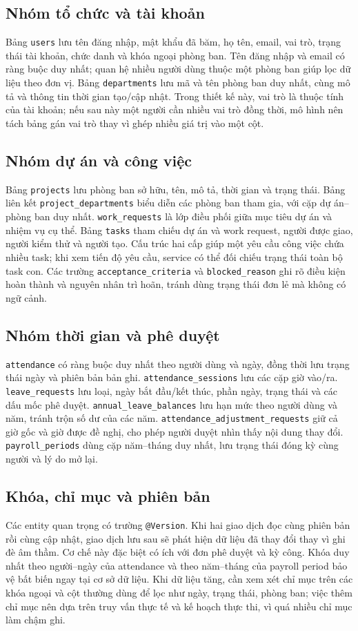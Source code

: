 \documentclass[12pt,a4paper,oneside]{report}
\newcommand{\code}[1]{\texttt{#1}}
\begin{document}
\subsection{Nhóm tổ chức và tài khoản}
Bảng \code{users} lưu tên đăng nhập, mật khẩu đã băm, họ tên, email, vai trò, trạng thái tài khoản, chức danh và khóa ngoại phòng ban. Tên đăng nhập và email có ràng buộc duy nhất; quan hệ nhiều người dùng thuộc một phòng ban giúp lọc dữ liệu theo đơn vị. Bảng \code{departments} lưu mã và tên phòng ban duy nhất, cùng mô tả và thông tin thời gian tạo/cập nhật. Trong thiết kế này, vai trò là thuộc tính của tài khoản; nếu sau này một người cần nhiều vai trò đồng thời, mô hình nên tách bảng gán vai trò thay vì ghép nhiều giá trị vào một cột.

\subsection{Nhóm dự án và công việc}
Bảng \code{projects} lưu phòng ban sở hữu, tên, mô tả, thời gian và trạng thái. Bảng liên kết \code{project\_departments} biểu diễn các phòng ban tham gia, với cặp dự án--phòng ban duy nhất. \code{work\_requests} là lớp điều phối giữa mục tiêu dự án và nhiệm vụ cụ thể. Bảng \code{tasks} tham chiếu dự án và work request, người được giao, người kiểm thử và người tạo. Cấu trúc hai cấp giúp một yêu cầu công việc chứa nhiều task; khi xem tiến độ yêu cầu, service có thể đối chiếu trạng thái toàn bộ task con. Các trường \code{acceptance\_criteria} và \code{blocked\_reason} ghi rõ điều kiện hoàn thành và nguyên nhân trì hoãn, tránh dùng trạng thái đơn lẻ mà không có ngữ cảnh.

\subsection{Nhóm thời gian và phê duyệt}
\code{attendance} có ràng buộc duy nhất theo người dùng và ngày, đồng thời lưu trạng thái ngày và phiên bản bản ghi. \code{attendance\_sessions} lưu các cặp giờ vào/ra. \code{leave\_requests} lưu loại, ngày bắt đầu/kết thúc, phần ngày, trạng thái và các dấu mốc phê duyệt. \code{annual\_leave\_balances} lưu hạn mức theo người dùng và năm, tránh trộn số dư của các năm. \code{attendance\_adjustment\_requests} giữ cả giờ gốc và giờ được đề nghị, cho phép người duyệt nhìn thấy nội dung thay đổi. \code{payroll\_periods} dùng cặp năm--tháng duy nhất, lưu trạng thái đóng kỳ cùng người và lý do mở lại.

\subsection{Khóa, chỉ mục và phiên bản}
Các entity quan trọng có trường \code{@Version}. Khi hai giao dịch đọc cùng phiên bản rồi cùng cập nhật, giao dịch lưu sau sẽ phát hiện dữ liệu đã thay đổi thay vì ghi đè âm thầm. Cơ chế này đặc biệt có ích với đơn phê duyệt và kỳ công. Khóa duy nhất theo người--ngày của attendance và theo năm--tháng của payroll period bảo vệ bất biến ngay tại cơ sở dữ liệu. Khi dữ liệu tăng, cần xem xét chỉ mục trên các khóa ngoại và cột thường dùng để lọc như ngày, trạng thái, phòng ban; việc thêm chỉ mục nên dựa trên truy vấn thực tế và kế hoạch thực thi, vì quá nhiều chỉ mục làm chậm ghi.
\end{document}
